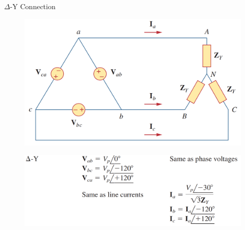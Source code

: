 \documentclass{beamer}
\begin{document}
\begin{frame}{$\Delta$-Y Connection}
    \begin{figure}[H]
        \centering
        \includegraphics[scale = 0.35]{C12/dy.png}
        \label{fig:enter-label}
    \end{figure}
    \begin{figure}[H]
        \centering
        \includegraphics[scale = 0.3]{C12/dy1.png}
        \label{fig:enter-label}
    \end{figure}
\end{frame}
\end{document}
